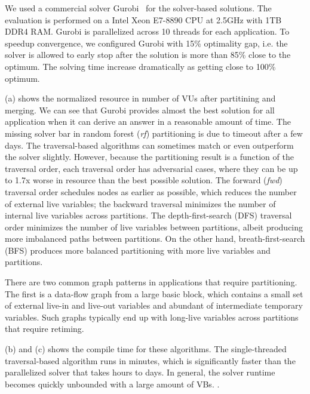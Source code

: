 We used a commercial solver Gurobi~\cite{gurobi} for the solver-based solutions. 
The evaluation is performed on a Intel Xeon E7-8890 CPU at 2.5GHz with 1TB DDR4 RAM. 
Gurobi is parallelized across 10 threads for each application.
To speedup convergence, we configured Gurobi with 15\% optimality gap, i.e. the solver is allowed to early 
stop after the solution is more than 85\% close to the optimum. 
The solving time increase dramatically as getting close to 100\% optimum.

 (a) shows the normalized resource in number of VUs after partitining and merging.
We can see that Gurobi provides almost the best solution for all application when it can derive
an answer in a reasonable amount of time. The missing solver bar in random forest (\emph{rf}) partitioning
is due to timeout after a few days.
The traversal-based algorithms can sometimes match or even outperform the solver slightly.
However, because the partitioning result is a function of the traversal order, 
each traversal order has adversarial cases, where they can be up to 1.7x worse in resource 
than the best possible solution.
The forward (\emph{fwd}) traversal order schedules nodes as earlier as possible, which reduces the number of
external live variables; the backward traversal minimizes the number of internal live variables
across partitions.
The depth-first-search (DFS) traversal order minimizes the number of live variables between partitions, 
albeit producing more imbalanced paths between partitions. 
On the other hand, breath-first-search (BFS) produces more balanced partitioning with more live variables and partitions.

There are two common graph patterns in applications that require partitioning. 
The first is a data-flow graph from a large basic block, which contains a small set of external
live-in and live-out variables and abundant of intermediate temporary variables.
Such graphs typically end up with long-live variables across partitions that require retiming.

 (b) and (c) shows the compile time for these algorithms. The single-threaded
traversal-based algorithm runs in minutes, which is significantly faster than the parallelized
solver that takes hours to days.
In general, the solver runtime becomes quickly unbounded with a large amount of VBs.
.


